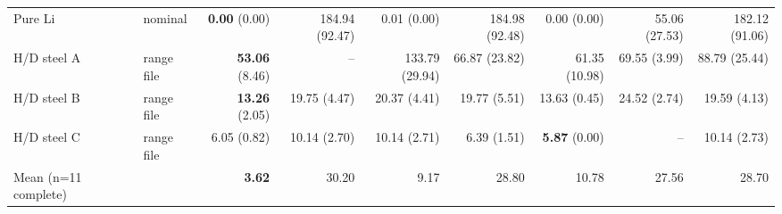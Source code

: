\begin{table}[t]
\begin{adjustbox}{max width=\textwidth}
\begin{tabular}{llrrrrrrr}
Pure Li & nominal & \textbf{0.00} (0.00) & 184.94 (92.47) & 0.01 (0.00) & 184.98 (92.48) & 0.00 (0.00) & 55.06 (27.53) & 182.12 (91.06) \\
H/D steel A & range file & \textbf{53.06} (8.46) & -- & 133.79 (29.94) & 66.87 (23.82) & 61.35 (10.98) & 69.55 (3.99) & 88.79 (25.44) \\
H/D steel B & range file & \textbf{13.26} (2.05) & 19.75 (4.47) & 20.37 (4.41) & 19.77 (5.51) & 13.63 (0.45) & 24.52 (2.74) & 19.59 (4.13) \\
H/D steel C & range file & 6.05 (0.82) & 10.14 (2.70) & 10.14 (2.71) & 6.39 (1.51) & \textbf{5.87} (0.00) & -- & 10.14 (2.73) \\
\midrule
Mean (n=11 complete) & & \textbf{3.62} & 30.20 & 9.17 & 28.80 & 10.78 & 27.56 & 28.70 \\
\bottomrule
\end{tabular}
\end{adjustbox}
\end{table}
